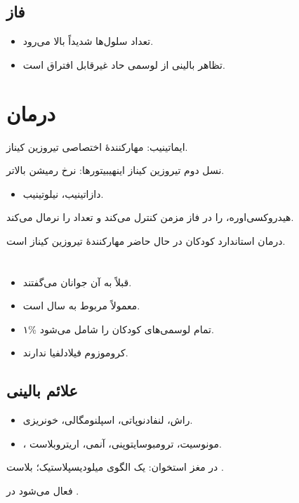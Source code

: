 \documentclass[12pt,a4paper]{article}
\begin{document}
\subsection*{فاز }
\begin{itemize}
\item تعداد سلول‌ها شدیداً بالا می‌رود.
\item تظاهر بالینی از لوسمی حاد غیرقابل افتراق است.
\end{itemize}

\section*{درمان }
ایماتینیب: مهارکنندهٔ اختصاصی  تیروزین کیناز.

نسل دوم تیروزین کیناز اینهیبیتورها: نرخ رمیشن بالاتر.
\begin{itemize}
\item دازاتینیب، نیلوتینیب.
\end{itemize}
هیدروکسی‌اوره،  را در فاز مزمن کنترل می‌کند و تعداد  را نرمال می‌کند.

درمان استاندارد  کودکان در حال حاضر مهارکنندهٔ تیروزین کیناز است.
\section*{}
\begin{itemize}
\item قبلاً به آن  جوانان می‌گفتند.
\item معمولاً مربوط به  سال است.
\item ۱\% تمام لوسمی‌های کودکان را شامل می‌شود.
\item کروموزوم فیلادلفیا ندارند.
\end{itemize}
\subsection*{علائم بالینی}
\begin{itemize}
\item راش، لنفادنوپاتی، اسپلنومگالی، خونریزی.
\item {}، \LeukemiaMath{\uparrow} مونوسیت، ترومبوسایتوپنی، آنمی، اریتروبلاست.
\end{itemize}
در مغز استخوان: یک الگوی میلودیسپلاستیک؛ بلاست .

 فعال می‌شود در .
\end{document}
